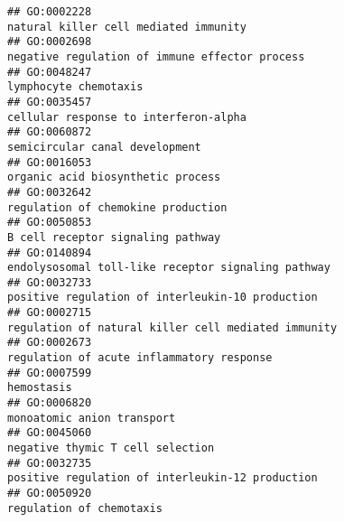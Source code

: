 \documentclass[
]{article}
\begin{document}
\begin{verbatim}
## GO:0002228                                                                                                            natural killer cell mediated immunity
## GO:0002698                                                                                                   negative regulation of immune effector process
## GO:0048247                                                                                                                            lymphocyte chemotaxis
## GO:0035457                                                                                                            cellular response to interferon-alpha
## GO:0060872                                                                                                                   semicircular canal development
## GO:0016053                                                                                                                organic acid biosynthetic process
## GO:0032642                                                                                                               regulation of chemokine production
## GO:0050853                                                                                                                B cell receptor signaling pathway
## GO:0140894                                                                                               endolysosomal toll-like receptor signaling pathway
## GO:0032733                                                                                                 positive regulation of interleukin-10 production
## GO:0002715                                                                                              regulation of natural killer cell mediated immunity
## GO:0002673                                                                                                        regulation of acute inflammatory response
## GO:0007599                                                                                                                                       hemostasis
## GO:0006820                                                                                                                       monoatomic anion transport
## GO:0045060                                                                                                                 negative thymic T cell selection
## GO:0032735                                                                                                 positive regulation of interleukin-12 production
## GO:0050920                                                                                                                         regulation of chemotaxis

\end{verbatim}
\end{document}
